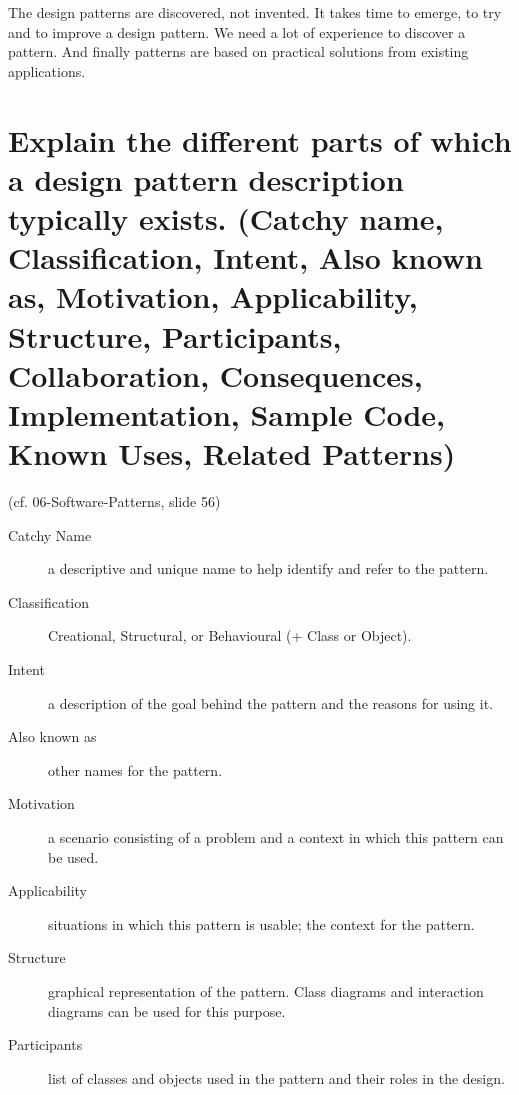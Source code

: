 The design patterns are discovered, not invented. It takes time to emerge, to try and to improve a design pattern. We need a lot of experience to discover a pattern. And finally patterns are based on practical solutions from existing applications.


\section{Explain the different parts of which a design pattern description typically exists.
(Catchy name, Classification, Intent, Also known as, Motivation, Applicability, Structure,
Participants, Collaboration, Consequences, Implementation, Sample Code, Known
Uses, Related Patterns)}

(cf. 06-Software-Patterns, slide 56)


\begin{description}
\item[Catchy Name]

	a descriptive and unique name to help identify and refer to the pattern.

\item[Classification]

	Creational, Structural, or Behavioural (+ Class or Object).

\item[Intent]

	a description of the goal behind the pattern and the reasons for using it.

\item[Also known as]

	other names for the pattern.

\item[Motivation]

	a scenario consisting of a problem and a context in which this pattern can be used.

\item[Applicability]

	situations in which this pattern is usable; the context for the pattern.

\item[Structure]

	graphical representation of the pattern. Class diagrams and interaction diagrams can be used for this purpose.

\item[Participants]

	list of classes and objects used in the pattern and their roles in the design.


\end{description}
